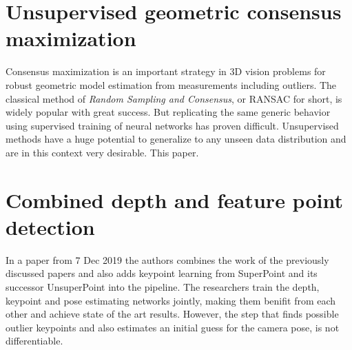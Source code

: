 \section{Unsupervised geometric consensus maximization}

Consensus maximization is an important strategy in 3D vision problems for robust geometric model estimation from measurements including outliers. The classical method of \textit{Random Sampling and Consensus}, or RANSAC\cite{ransac} for short, is widely popular with great success. But replicating the same generic behavior using supervised training of neural networks has proven difficult. Unsupervised methods have a huge potential to generalize to any unseen data distribution and are in this context very desirable. This paper\cite{consensus}.

\section{Combined depth and feature point detection}

In a paper\cite{keypointdepth} from 7 Dec 2019 the authors combines the work of the previously discussed papers and also adds keypoint learning from SuperPoint\cite{superpoint} and its successor UnsuperPoint\cite{unsuperpoint} into the pipeline. The researchers train the depth, keypoint and pose estimating networks jointly, making them benifit from each other and achieve state of the art results. However, the step that finds possible outlier keypoints and also estimates an initial guess for the camera pose, is not differentiable.